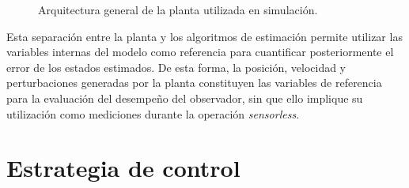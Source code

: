 \begin{figure}[htbp]
    \centering


    \caption{Arquitectura general de la planta utilizada en simulación.}
    \label{fig:arquitectura_planta}
\end{figure}

Esta separación entre la planta y los algoritmos de estimación permite
utilizar las variables internas del modelo como referencia para
cuantificar posteriormente el error de los estados estimados. De esta
forma, la posición, velocidad y perturbaciones generadas por la planta
constituyen las variables de referencia para la evaluación del
desempeño del observador, sin que ello implique su utilización como
mediciones durante la operación \textit{sensorless}.





\section{Estrategia de control}
\label{sec:estrategia_control}

